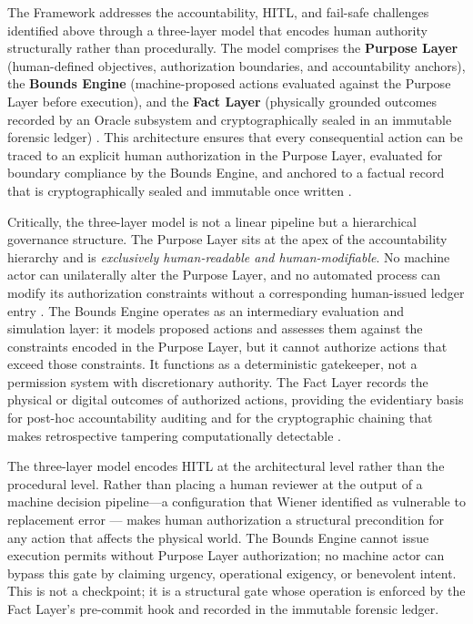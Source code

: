 The \bxthree{} Framework addresses the accountability, HITL, and fail-safe challenges identified above through a three-layer model that encodes human authority structurally rather than procedurally. The model comprises the \textbf{Purpose Layer} (human-defined objectives, authorization boundaries, and accountability anchors), the \textbf{Bounds Engine} (machine-proposed actions evaluated against the Purpose Layer before execution), and the \textbf{Fact Layer} (physically grounded outcomes recorded by an Oracle subsystem and cryptographically sealed in an immutable forensic ledger) \cite{wiener1948}. This architecture ensures that every consequential action can be traced to an explicit human authorization in the Purpose Layer, evaluated for boundary compliance by the Bounds Engine, and anchored to a factual record that is cryptographically sealed and immutable once written \cite{bansal2019}.

Critically, the three-layer model is not a linear pipeline but a hierarchical governance structure. The Purpose Layer sits at the apex of the accountability hierarchy and is \emph{exclusively human-readable and human-modifiable}. No machine actor can unilaterally alter the Purpose Layer, and no automated process can modify its authorization constraints without a corresponding human-issued ledger entry \cite{dijkstra1982}. The Bounds Engine operates as an intermediary evaluation and simulation layer: it models proposed actions and assesses them against the constraints encoded in the Purpose Layer, but it cannot authorize actions that exceed those constraints. It functions as a deterministic gatekeeper, not a permission system with discretionary authority. The Fact Layer records the physical or digital outcomes of authorized actions, providing the evidentiary basis for post-hoc accountability auditing and for the cryptographic chaining that makes retrospective tampering computationally detectable \cite{bansal2019}.

The three-layer model encodes HITL at the architectural level rather than the procedural level. Rather than placing a human reviewer at the output of a machine decision pipeline—a configuration that Wiener identified as vulnerable to replacement error \cite{wiener1948}—\bxthree{} makes human authorization a structural precondition for any action that affects the physical world. The Bounds Engine cannot issue execution permits without Purpose Layer authorization; no machine actor can bypass this gate by claiming urgency, operational exigency, or benevolent intent. This is not a checkpoint; it is a structural gate whose operation is enforced by the Fact Layer's pre-commit hook and recorded in the immutable forensic ledger.

